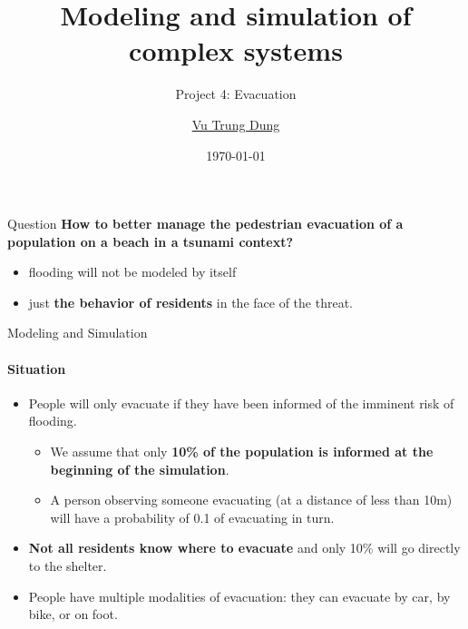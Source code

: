 \documentclass{beamer}
\title{Modeling and simulation of complex systems}
\subtitle{Project 4: Evacuation}
\author{\href{mailto:dungvt2440071@usth.edu.vn}{Vu Trung Dung}}
\date{\today}
\begin{document}
\maketitle
{} %



\begin{frame}[fragile]{Question}
\textbf{How to better manage the pedestrian evacuation of a population on a beach
in a tsunami context?}

\begin{itemize}
\item flooding will not be modeled by itself
\item just \textbf{the behavior of residents} in the face of the threat.
\end{itemize}
\end{frame}


\begin{frame}[fragile]{Modeling and Simulation}
\framesubtitle{Situation}
\begin{itemize}
\item People will only evacuate if they have been informed of the imminent risk of flooding. 
\begin{itemize}
    \item We assume that only \textbf{10\% of the population is informed at the beginning of the simulation}.
    \item A person observing someone evacuating
    (at a distance of less than 10m) will have a probability of 0.1 of evacuating in turn.
\end{itemize}
\item \textbf{Not all residents know where to evacuate} and only 10\% will go directly to the shelter.
\item People have multiple modalities of evacuation: they can evacuate by car, by bike, or on foot.
\end{itemize}
\end{frame}
\end{document}
